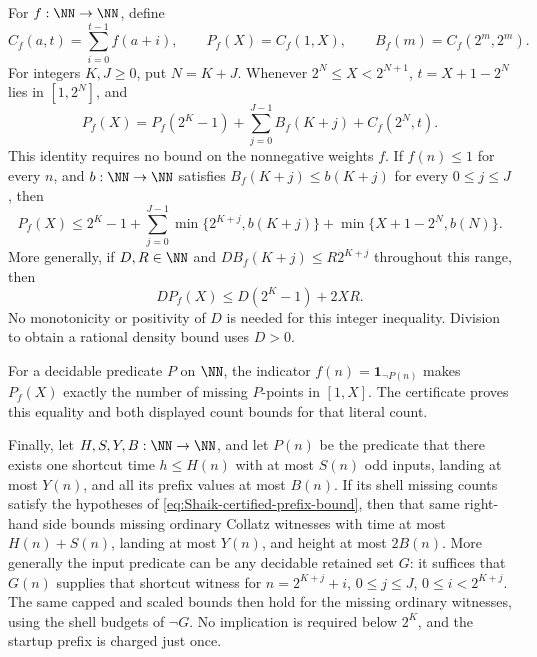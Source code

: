 \begin{proposition}
\label{prop:Shaik-dyadic-certificate}
For \(f:\NN\to\NN\), define
\[
 C_f(a,t)=\sum_{i=0}^{t-1}f(a+i),\qquad
 P_f(X)=C_f(1,X),\qquad B_f(m)=C_f(2^m,2^m).
\]
For integers \(K,J\ge0\), put \(N=K+J\). Whenever
\(2^N\le X<2^{N+1}\), \(t=X+1-2^N\) lies in \([1,2^N]\), and
\begin{equation}\label{eq:Shaik-certified-prefix-partition}
 P_f(X)=P_f(2^K-1)+\sum_{j=0}^{J-1}B_f(K+j)+C_f(2^N,t).
\end{equation}
This identity requires no bound on the nonnegative weights \(f\).
If \(f(n)\le1\) for every \(n\), and \(b:\NN\to\NN\) satisfies
\(B_f(K+j)\le b(K+j)\) for every \(0\le j\le J\), then
\begin{equation}\label{eq:Shaik-certified-prefix-bound}
 P_f(X)\le 2^K-1+
 \sum_{j=0}^{J-1}\min\{2^{K+j},b(K+j)\}
             +\min\{X+1-2^N,b(N)\}.
\end{equation}
More generally, if \(D,R\in\NN\) and
\(D B_f(K+j)\le R2^{K+j}\) throughout this range, then
\begin{equation}\label{eq:Shaik-certified-scaled-tail}
 D P_f(X)\le D(2^K-1)+2XR .
\end{equation}
No monotonicity or positivity of \(D\) is needed for this integer
inequality. Division to obtain a rational density bound uses \(D>0\).

For a decidable predicate \(P\) on \(\NN\), the indicator
\(f(n)=\boldsymbol1_{\neg P(n)}\) makes \(P_f(X)\) exactly the
number of missing \(P\)-points in \([1,X]\). The certificate proves
this equality and both displayed count bounds for that literal count.

Finally, let \(H,S,Y,B:\NN\to\NN\), and let \(P(n)\) be the predicate
that there exists one shortcut time \(h\le H(n)\) with at most \(S(n)\)
odd inputs, landing at most \(Y(n)\), and all its prefix values at
most \(B(n)\). If its shell missing counts satisfy the hypotheses of
\eqref{eq:Shaik-certified-prefix-bound}, then that same right-hand
side bounds missing ordinary Collatz witnesses with time at most
\(H(n)+S(n)\), landing at most \(Y(n)\), and height at most \(2B(n)\).
More generally the input predicate can be any decidable retained set
\(G\): it suffices that \(G(n)\) supplies that shortcut witness for
\(n=2^{K+j}+i\), \(0\le j\le J\), \(0\le i<2^{K+j}\).
The same capped and scaled bounds then hold for the missing ordinary
witnesses, using the shell budgets of \(\neg G\). No implication is
required below \(2^K\), and the startup prefix is charged just once.
\end{proposition}
